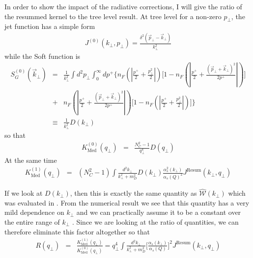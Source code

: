 \documentclass[letter,11pt]{article}
\newcommand{\nn}{\nonumber}
\newcommand{\bea}{\begin{eqnarray}}
\newcommand{\eea}{\end{eqnarray}}
\def\nn{\nonumber}
\begin{document}
In order to show the impact of the radiative corrections, I will give the ratio of the resummed kernel to the tree level result. 
At tree level for a non-zero $p_{\perp}$, the jet function has a simple form 
\bea
 J^{(0)}(k_{\perp}, p_{\perp})=\frac{\delta^2(\vec{p}_{\perp}-\vec{k}_{\perp})}{k_{\perp}^2} 
\eea
 while the Soft function is 
\bea
S_G^{(0)}(\vec{k}_{\perp})&=& \frac{1}{k_{\perp}^2} \int d^2p_{\perp}\int_0^{\infty} dp^+ \Bigg\{n_F\left(|\frac{p^+}{2}+\frac{p_{\perp}^2}{2}|\right)\Big[1-n_F(|\frac{p^+}{2}+\frac{(\vec{p}_{\perp}+\vec{k}_{\perp})^2}{2p^+}|)\Big]\nn\\
&+&n_F(|\frac{p^+}{2}+\frac{(\vec{p}_{\perp}+\vec{k}_{\perp})^2}{2p^+}|)\Big[1-n_F\left(|\frac{p^+}{2}+\frac{p_{\perp}^2}{2}|\right)\Big]\Bigg\}\nn\\
&\equiv& \frac{1}{k_{\perp}^2} D(k_{\perp})
\eea
so that 
\bea
K^{(0)}_{\text{Med}}(q_{\perp}) &=&\frac{N_C^2-1}{q_{\perp}^4} D(q_{\perp})
\eea
At the same time 
\bea
 K^{(1)}_{\text{Med}}(q_{\perp}) &=&(N_C^2-1)\int \frac{d^2k_{\perp}}{k_{\perp}^2+m_D^2} D(k_{\perp})\frac{\alpha^2_s(k_{\perp})}{\alpha_s(Q)^2} J^{\text{Resum}}(k_{\perp}, q_{\perp})
\eea

If we look at $D(k_{\perp})$, then this is exactly the same quantity as $\widehat{\mathcal{W}}(k_{\perp})$ which was evaluated in \cite{Vaidya:2020cyi}. From the numerical result we see that this quantity has a very mild dependence on $k_{\perp}$ and we can practically assume it to be a constant over the entire range of $k_{\perp}$ . Since we are looking at the ratio of quantities, we can therefore eliminate this factor altogether so that 
\bea
R(q_{\perp})&=& \frac{K^{(1)}_{\text{Med}}(q_{\perp}) }{K^{(0)}_{\text{Med}}(q_{\perp}) }=q_{\perp}^4\int \frac{d^2k_{\perp}}{k_{\perp}^2+m_D^2}\Bigg[\frac{\alpha_s(k_{\perp})}{\alpha_s(Q)}\Bigg]^{2}J^{\text{Resum}}(k_{\perp}, q_{\perp})
\eea
\end{document}
